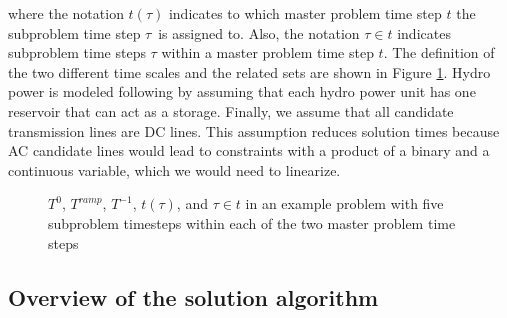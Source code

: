 \documentclass[final]{IEEEtran}
\begin{document}
where the notation $t(\tau)$ indicates to which master problem time step $t$ the subproblem time step $\tau$ is assigned to. Also, the notation $\tau \in t$ indicates subproblem time steps $\tau$ within a master problem time step $t$. The definition of the two different time scales and the related sets are shown in Figure \ref{fig_time_scales}. Hydro power is modeled following \cite{Debia} by assuming that each hydro power unit has one reservoir that can act as a storage. Finally, we assume that all candidate transmission lines are DC lines. This assumption reduces solution times because AC candidate lines would lead to constraints with a product of a binary and a continuous variable, which we would need to linearize.

\begin{figure}[htpb]
	\caption{$T^0$, $T^{ramp}$, $T^{-1}$, $t(\tau)$, and $\tau \in t$ in an example problem with five subproblem timesteps within each of the two master problem time steps}
	\label{fig_time_scales}
\end{figure}

\subsection{Overview of the solution algorithm}
\end{document}
